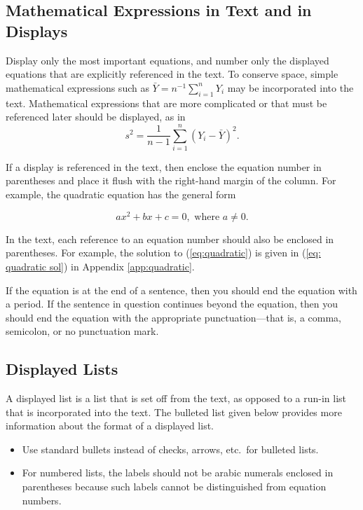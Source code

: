 \documentclass{wscpaperproc}
\theoremstyle{wsc}
\begin{document}
\subsection{Mathematical Expressions in Text and in Displays}
Display only the most important equations, and number only the displayed equations that are explicitly referenced in the text.
To conserve space, simple mathematical expressions such as $\bar Y = n^{-1} \sum_{i=1}^n Y_i$ may be incorporated into the text.
Mathematical expressions that are more complicated or that must be referenced later should be displayed, as in
$$s^2 = \frac 1 {n-1} \sum_{i=1}^n (Y_i - \bar Y)^2.$$

If a display is referenced in the text, then enclose the equation number in parentheses and place it flush with the right-hand margin of the
column. For example, the quadratic equation has the general form

\begin{equation} \label{eq:quadratic}
ax^2 + bx + c = 0, \mbox{ where } a \ne 0.
\end{equation}

In the text, each reference to an equation number should also be enclosed in parentheses. For example, the solution to (\ref{eq:quadratic}) is given in (\ref{eq: quadratic sol}) in Appendix \ref{app:quadratic}.

If the equation is at the end of a sentence, then you should end the equation with a period. If the sentence in question continues beyond the equation, then you should end the equation with the appropriate punctuation---that is, a comma, semicolon, or no punctuation mark.

\subsection{Displayed Lists}
A displayed list is a list that is set off from the text, as opposed to a run-in list that is incorporated into the text. The bulleted list given below provides more information about the format of a displayed list.

\begin{itemize}
	\item Use standard bullets instead of checks, arrows, etc.\ for bulleted lists.
	\item For numbered lists, the labels should not be arabic numerals enclosed in parentheses because such labels cannot be distinguished from equation numbers.
\end{itemize}
\end{document}
